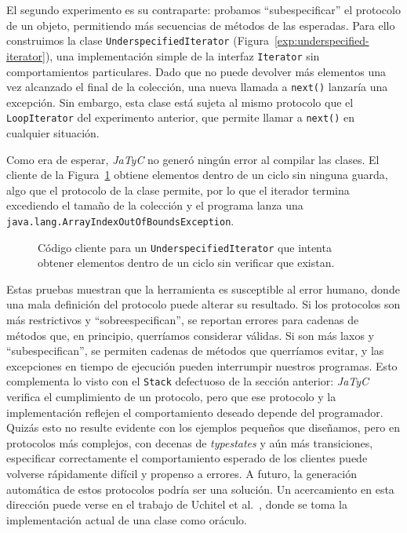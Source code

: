 El segundo experimento es su contraparte: probamos ``subespecificar'' el protocolo de un objeto, permitiendo más secuencias de métodos de las esperadas. Para ello construimos la clase \texttt{UnderspecifiedIterator} (Figura~\ref{exp:underspecified-iterator}), una implementación simple de la interfaz \texttt{Iterator} sin comportamientos particulares. Dado que no puede devolver más elementos una vez alcanzado el final de la colección, una nueva llamada a \texttt{next()} lanzaría una excepción. Sin embargo, esta clase está sujeta al mismo protocolo que el \texttt{LoopIterator} del experimento anterior, que permite llamar a \texttt{next()} en cualquier situación.

Como era de esperar, \textit{JaTyC} no generó ningún error al compilar las clases. El cliente de la Figura~\ref{exp:underspecified-iterator:client} obtiene elementos dentro de un ciclo sin ninguna guarda, algo que el protocolo de la clase permite, por lo que el iterador termina excediendo el tamaño de la colección y el programa lanza una \texttt{java.lang.ArrayIndexOutOfBoundsException}.

\begin{figure}[htbp]
    \centering
    
    \caption{Código cliente para un \texttt{UnderspecifiedIterator} que intenta obtener elementos dentro de un ciclo sin verificar que existan.}
    \label{exp:underspecified-iterator:client}
\end{figure}

Estas pruebas muestran que la herramienta es susceptible al error humano, donde una mala definición del protocolo puede alterar su resultado. Si los protocolos son más restrictivos y ``sobreespecifican'', se reportan errores para cadenas de métodos que, en principio, querríamos considerar válidas. Si son más laxos y ``subespecifican'', se permiten cadenas de métodos que querríamos evitar, y las excepciones en tiempo de ejecución pueden interrumpir nuestros programas. Esto complementa lo visto con el \texttt{Stack} defectuoso de la sección anterior: \textit{JaTyC} verifica el cumplimiento de un protocolo, pero que ese protocolo y la implementación reflejen el comportamiento deseado depende del programador. Quizás esto no resulte evidente con los ejemplos pequeños que diseñamos, pero en protocolos más complejos, con decenas de \textit{typestates} y aún más transiciones, especificar correctamente el comportamiento esperado de los clientes puede volverse rápidamente difícil y propenso a errores. A futuro, la generación automática de estos protocolos podría ser una solución. Un acercamiento en esta dirección puede verse en el trabajo de Uchitel et al.~\cite{xepa}, donde se toma la implementación actual de una clase como oráculo.

